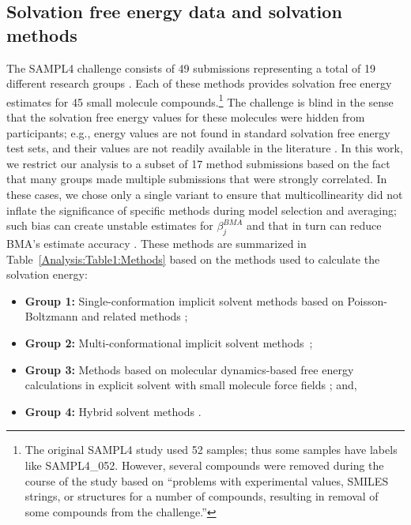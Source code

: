 \documentclass[journal=jpcbfk, manuscript=article]{achemso}
\newcommand{\+}[1]{\ensuremath{\mathbf{#1}}}
\begin{document}
\subsection{Solvation free energy data and solvation methods} \label{EP:DataModels}
The SAMPL4 challenge consists of 49 submissions representing a total of 19 different research groups \cite{Mobley:2014}.
Each of these methods provides solvation free energy estimates for 45 small molecule compounds.\footnote{The original SAMPL4 study used 52 samples; thus some samples have labels like SAMPL4\_052. However, several compounds were removed during the course of the study based on ``problems with experimental values, SMILES strings, or structures for a number of compounds, resulting in removal of some compounds from the challenge.''\cite{Mobley:2014}}
The challenge is blind in the sense that the solvation free energy values for these molecules were hidden from participants; e.g., energy values are not found in standard solvation free energy test sets, and their values are not readily available in the literature \cite{Guthrie:2014}. 
In this work, we restrict our analysis to a subset of 17 method submissions based on the fact that many groups made multiple submissions that were strongly correlated.
In these cases, we chose only a single variant to ensure that multicollinearity did not inflate the significance of specific methods during model selection and averaging; such bias can create unstable estimates for $\beta^{BMA}_j$ and that in turn can reduce BMA's estimate accuracy \cite{Clyde:1999}.
These methods are summarized in Table~\ref{Analysis:Table1:Methods} based on the methods used to calculate the solvation energy: 
\begin{itemize} 
	\item \textbf{Group 1:} Single-conformation implicit solvent methods \cite{Ellingson:2014, Nicholl:2010, Hawkins} based on Poisson-Boltzmann and related methods \cite{Fixman:1979, Honig:1995, Davis:1990};
	\item \textbf{Group 2:} Multi-conformational implicit solvent methods~\cite{Sandberg:2013, Klamt:2009, Hogues:2014, Sulea:2011, Reinisch:2014}; 
	\item \textbf{Group 3:} Methods based on molecular dynamics-based free energy calculations in explicit solvent \cite{Klimovich:2010,Muddana:2014,Mobley:2009c,Mobley:2007} with small molecule force fields \cite{Wang:2004B};  and, 
	\item \textbf{Group 4:} Hybrid solvent methods \cite{Li:2014}.
\end{itemize}
\end{document}
